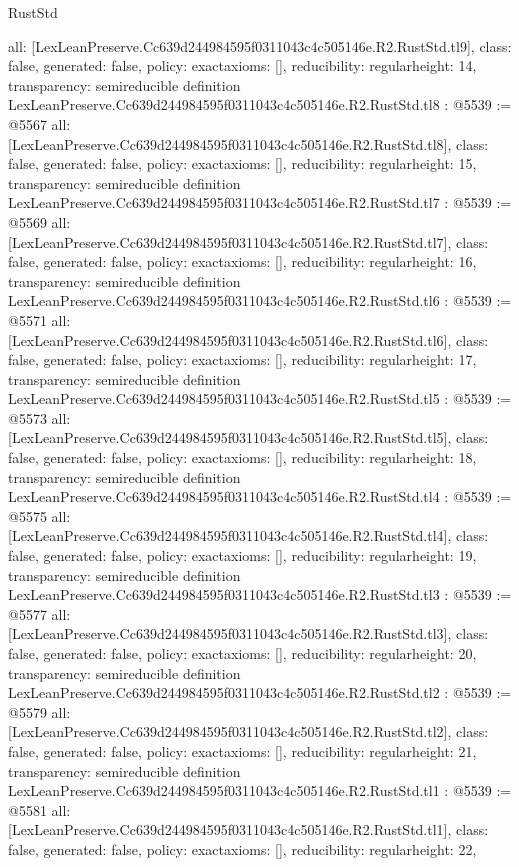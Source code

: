 \begin{lexlean}{RustStd}
\begin{coremodule}
{  all: [LexLeanPreserve.Cc639d244984595f0311043c4c505146e.R2.RustStd.tl9],
  class: false,
  generated: false,
  policy: exact{axioms: []},
  reducibility: regular{height: 14},
  transparency: semireducible
}
definition LexLeanPreserve.Cc639d244984595f0311043c4c505146e.R2.RustStd.tl8 : @5539 := @5567 {
  all: [LexLeanPreserve.Cc639d244984595f0311043c4c505146e.R2.RustStd.tl8],
  class: false,
  generated: false,
  policy: exact{axioms: []},
  reducibility: regular{height: 15},
  transparency: semireducible
}
definition LexLeanPreserve.Cc639d244984595f0311043c4c505146e.R2.RustStd.tl7 : @5539 := @5569 {
  all: [LexLeanPreserve.Cc639d244984595f0311043c4c505146e.R2.RustStd.tl7],
  class: false,
  generated: false,
  policy: exact{axioms: []},
  reducibility: regular{height: 16},
  transparency: semireducible
}
definition LexLeanPreserve.Cc639d244984595f0311043c4c505146e.R2.RustStd.tl6 : @5539 := @5571 {
  all: [LexLeanPreserve.Cc639d244984595f0311043c4c505146e.R2.RustStd.tl6],
  class: false,
  generated: false,
  policy: exact{axioms: []},
  reducibility: regular{height: 17},
  transparency: semireducible
}
definition LexLeanPreserve.Cc639d244984595f0311043c4c505146e.R2.RustStd.tl5 : @5539 := @5573 {
  all: [LexLeanPreserve.Cc639d244984595f0311043c4c505146e.R2.RustStd.tl5],
  class: false,
  generated: false,
  policy: exact{axioms: []},
  reducibility: regular{height: 18},
  transparency: semireducible
}
definition LexLeanPreserve.Cc639d244984595f0311043c4c505146e.R2.RustStd.tl4 : @5539 := @5575 {
  all: [LexLeanPreserve.Cc639d244984595f0311043c4c505146e.R2.RustStd.tl4],
  class: false,
  generated: false,
  policy: exact{axioms: []},
  reducibility: regular{height: 19},
  transparency: semireducible
}
definition LexLeanPreserve.Cc639d244984595f0311043c4c505146e.R2.RustStd.tl3 : @5539 := @5577 {
  all: [LexLeanPreserve.Cc639d244984595f0311043c4c505146e.R2.RustStd.tl3],
  class: false,
  generated: false,
  policy: exact{axioms: []},
  reducibility: regular{height: 20},
  transparency: semireducible
}
definition LexLeanPreserve.Cc639d244984595f0311043c4c505146e.R2.RustStd.tl2 : @5539 := @5579 {
  all: [LexLeanPreserve.Cc639d244984595f0311043c4c505146e.R2.RustStd.tl2],
  class: false,
  generated: false,
  policy: exact{axioms: []},
  reducibility: regular{height: 21},
  transparency: semireducible
}
definition LexLeanPreserve.Cc639d244984595f0311043c4c505146e.R2.RustStd.tl1 : @5539 := @5581 {
  all: [LexLeanPreserve.Cc639d244984595f0311043c4c505146e.R2.RustStd.tl1],
  class: false,
  generated: false,
  policy: exact{axioms: []},
  reducibility: regular{height: 22},
}
\end{coremodule}
\end{lexlean}
